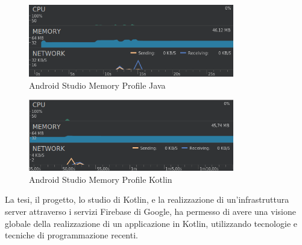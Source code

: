 \begin{figure}[!hb]
  \centering
  \includegraphics[width=0.8\textwidth]{immagini/app_java_memory_graph.png}
  \caption{Android Studio Memory Profile Java}\label{fig:Android Studio Memory Profile Java}
\end{figure}

\begin{figure}[!hb]
  \centering
  \includegraphics[width=0.8\textwidth]{immagini/app_kotlin_memory_graph.png}
  \caption{Android Studio Memory Profile Kotlin}\label{fig:Android Studio Memory Profile Kotlin }
\end{figure}
La tesi, il progetto, lo studio di Kotlin, e la realizzazione di un'infrastruttura server attraverso i servizi Firebase di Google, ha permesso di avere una visione globale della realizzazione di un applicazione in Kotlin, utilizzando tecnologie e tecniche di programmazione recenti.



\clearpage{\pagestyle{empty}\cleardoublepage}
